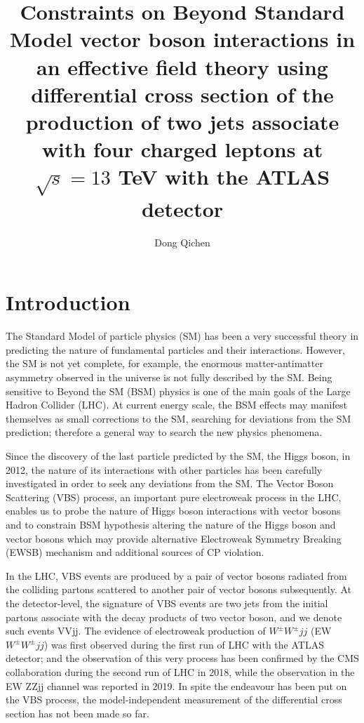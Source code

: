 \documentclass[a4paper,12pt]{article}
\title{\boldmath Constraints on Beyond Standard Model vector boson interactions 
		in an effective field theory using differential cross section of the production 
		of two jets associate with four charged leptons at 
		$\sqrt{s} = 13$ TeV with the ATLAS detector}
\author{Dong Qichen}
\affiliation{The University of Manchester,\\316 Oxford Road, UK}
\begin{document}
 
	\maketitle
	\flushbottom

	\section{Introduction}
		\label{sec:intro}
		\par The Standard Model of particle physics (SM)\cite{Gaillard_1999} has been
		a very successful theory in predicting the nature of fundamental particles and their interactions.
		However, the SM is not yet complete, for example, the enormous matter-antimatter asymmetry\cite{Canetti_2012}
		observed in the universe is not fully described by the SM. Being sensitive to Beyond the SM (BSM)
		physics is one of the main goals of the Large Hadron Collider (LHC)\cite{Evans_2008}. At current energy 
		scale, the BSM effects may manifest themselves as small corrections to the SM, searching for 
		deviations from the SM prediction; therefore a general way to search the new physics phenomena.

		\par Since the discovery of the last particle predicted by the SM, the Higgs boson, in 2012\cite{Aad_2012}, 
		the nature of its interactions with other particles has been carefully investigated in order 
		to seek any deviations from the SM. The Vector Boson Scattering (VBS) process\cite{rauch2016vectorboson}, 
		an important pure electroweak process in the LHC, enables us to probe the nature of Higgs 
		boson interactions with vector bosons and to constrain BSM hypothesis altering the nature of the 
		Higgs boson and vector bosons which may provide alternative Electroweak Symmetry Breaking (EWSB) 
		mechanism\cite{dawson1999introduction} and additional sources of CP violation\cite{peccei1995cp}.

		\par In the LHC, VBS events are produced by a pair of vector bosons 
		radiated from the colliding partons scattered to another pair of 
		vector bosons subsequently. At the detector-level, the signature 
		of VBS events are two jets from the initial partons associate 
		with the decay products of two vector boson, and we denote such 
		events VVjj. The evidence of electroweak production of ${W^{\pm}W^{\pm}jj}$
		(EW ${W^{\pm}W^{\pm}jj}$) was first observed during the 
		first run of LHC with the ATLAS detector\cite{Aad_2014}; and the observation of this very process has been 
		confirmed by the CMS\cite{Chatrchyan:2008aa} collaboration during the second 
		run of LHC in 2018\cite{Sirunyan_2018}, while the observation in the EW ZZjj channel 
		was reported in 2019\cite{ATLAS-CONF-2019-033}. In spite the endeavour 
		has been put on the VBS process, the model-independent measurement of the differential 
		cross section has not been made so far.
\end{document}
